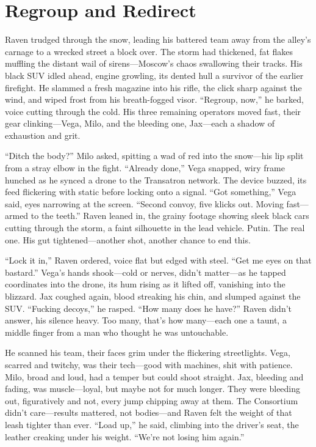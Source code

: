 \documentclass[12pt]{book}
\begin{document}
\section{Regroup and Redirect}

Raven trudged through the snow, leading his battered team away from the alley’s carnage to a wrecked street a block over. The storm had thickened, fat flakes muffling the distant wail of sirens—Moscow’s chaos swallowing their tracks. His black SUV idled ahead, engine growling, its dented hull a survivor of the earlier firefight. He slammed a fresh magazine into his rifle, the click sharp against the wind, and wiped frost from his breath-fogged visor. “Regroup, now,” he barked, voice cutting through the cold. His three remaining operators moved fast, their gear clinking—Vega, Milo, and the bleeding one, Jax—each a shadow of exhaustion and grit.

“Ditch the body?” Milo asked, spitting a wad of red into the snow—his lip split from a stray elbow in the fight. “Already done,” Vega snapped, wiry frame hunched as he synced a drone to the Transatron network. The device buzzed, its feed flickering with static before locking onto a signal. “Got something,” Vega said, eyes narrowing at the screen. “Second convoy, five klicks out. Moving fast—armed to the teeth.” Raven leaned in, the grainy footage showing sleek black cars cutting through the storm, a faint silhouette in the lead vehicle. Putin. The real one. His gut tightened—another shot, another chance to end this.

“Lock it in,” Raven ordered, voice flat but edged with steel. “Get me eyes on that bastard.” Vega’s hands shook—cold or nerves, didn’t matter—as he tapped coordinates into the drone, its hum rising as it lifted off, vanishing into the blizzard. Jax coughed again, blood streaking his chin, and slumped against the SUV. “Fucking decoys,” he rasped. “How many does he have?” Raven didn’t answer, his silence heavy. Too many, that’s how many—each one a taunt, a middle finger from a man who thought he was untouchable.

He scanned his team, their faces grim under the flickering streetlights. Vega, scarred and twitchy, was their tech—good with machines, shit with patience. Milo, broad and loud, had a temper but could shoot straight. Jax, bleeding and fading, was muscle—loyal, but maybe not for much longer. They were bleeding out, figuratively and not, every jump chipping away at them. The Consortium didn’t care—results mattered, not bodies—and Raven felt the weight of that leash tighter than ever. “Load up,” he said, climbing into the driver’s seat, the leather creaking under his weight. “We’re not losing him again.”
\end{document}
